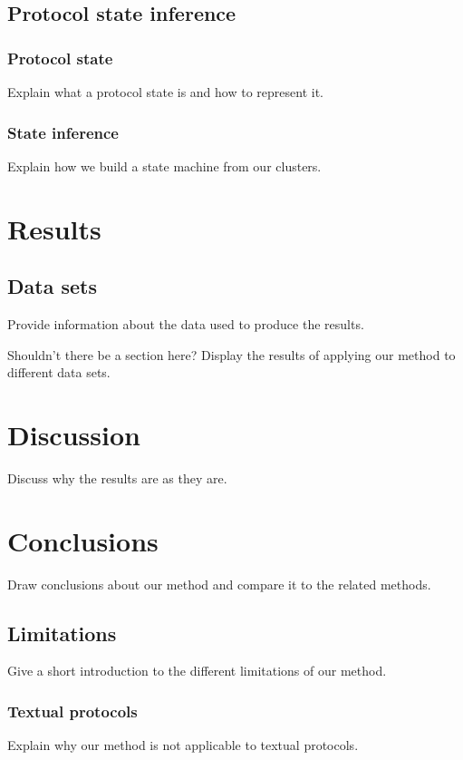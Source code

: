 \documentclass[a4paper]{report}
\begin{document}
\section{Protocol state inference}

\subsection{Protocol state}
Explain what a protocol state is and how to represent it.

\subsection{State inference}
Explain how we build a state machine from our clusters.

\chapter{Results}

\section{Data sets}
Provide information about the data used to produce the results.

Shouldn't there be a section here?
Display the results of applying our method to different data sets.

\chapter{Discussion}
Discuss why the results are as they are.

\chapter{Conclusions}
Draw conclusions about our method and compare it to the related methods.

\section{Limitations}
Give a short introduction to the different limitations of our method.

\subsection{Textual protocols}
Explain why our method is not applicable to textual protocols.
\end{document}
